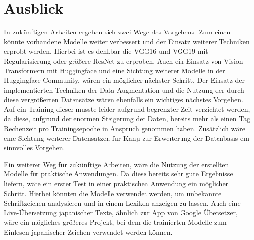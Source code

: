 \documentclass[twoside,a4paper]{IEEEtran}
\begin{document}
\section{Ausblick}
In zukünftigen Arbeiten ergeben sich zwei Wege des Vorgehens. Zum einen könnte vorhandene Modelle weiter verbessert und der Einsatz weiterer Techniken erprobt werden. Hierbei ist es denkbar die VGG16 und VGG19 mit Regularisierung oder größere ResNet zu erproben. Auch ein Einsatz von Vision Transformern mit Huggingface und eine Sichtung weiterer Modelle in der Huggingface Community, wären ein möglicher nächster Schritt. Der Einsatz der implementierten Techniken der Data Augmentation und die Nutzung der durch diese vergrößerten Datensätze wären ebenfalls ein wichtiges nächstes Vorgehen. Auf ein Training dieser musste leider aufgrund begrenzter Zeit verzichtet werden, da diese, aufgrund der enormen Steigerung der Daten, bereits mehr als einen Tag Rechenzeit pro Trainingsepoche in Anspruch genommen haben. Zusätzlich wäre eine Sichtung weiterer Datensätzen für Kanji zur Erweiterung der Datenbasis ein sinnvolles Vorgehen.

Ein weiterer Weg für zukünftige Arbeiten, wäre die Nutzung der erstellten Modelle für praktische Anwendungen. Da diese bereits sehr gute Ergebnisse liefern, wäre ein erster Test in einer praktischen Anwendung ein möglicher Schritt. Hierbei könnten die Modelle verwendet werden, um unbekannte Schriftzeichen analysieren und in einem Lexikon anzeigen zu lassen. Auch eine Live-Übersetzung japanischer Texte, ähnlich zur App von Google Übersetzer, wäre ein mögliches größeres Projekt, bei dem die trainierten Modelle zum Einlesen japanischer Zeichen verwendet werden können.



%
%
\end{document}
